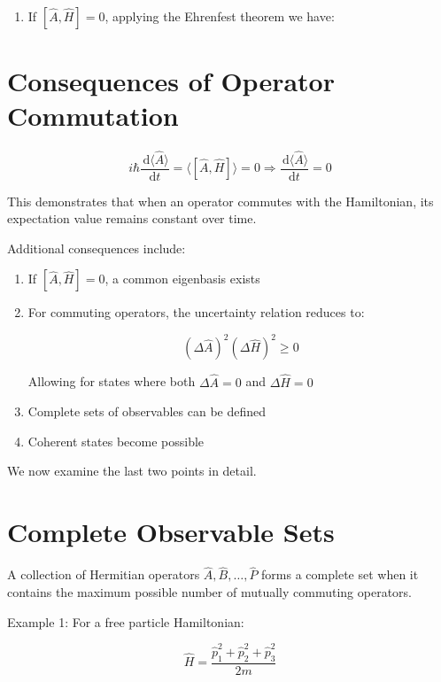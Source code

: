 \begin{enumerate}
  \item If $[\hat{A}, \hat{H}]=0$, applying the Ehrenfest theorem we have:
\end{enumerate}


\section{Consequences of Operator Commutation}

\begin{equation}
i \hbar \frac{\, \mathrm{d}\langle\hat{A}\rangle}{\mathrm{d} t}=\langle[\hat{A}, \hat{H}]\rangle=0 \Longrightarrow \frac{\, \mathrm{d}\langle\hat{A}\rangle}{\mathrm{d} t}=0
\end{equation}

This demonstrates that when an operator commutes with the Hamiltonian, its expectation value remains constant over time.

Additional consequences include:
\begin{enumerate}
  \item If $[\hat{A}, \hat{H}]=0$, a common eigenbasis exists
  \item For commuting operators, the uncertainty relation reduces to:

\begin{equation}
(\Delta \hat{A})^{2}(\Delta \hat{H})^{2} \geq 0
\end{equation}

  Allowing for states where both $\Delta \hat{A}=0$ and $\Delta \hat{H}=0$
  \item Complete sets of observables can be defined
  \item Coherent states become possible
\end{enumerate}

We now examine the last two points in detail.

\section{Complete Observable Sets}
A collection of Hermitian operators $\hat{A}, \hat{B}, \ldots, \hat{P}$ forms a complete set when it contains the maximum possible number of mutually commuting operators.

Example 1: For a free particle Hamiltonian:

\begin{equation}
\hat{H}=\frac{\hat{p}_{1}^{2}+\hat{p}_{2}^{2}+\hat{p}_{3}^{2}}{2 m}
\end{equation}

